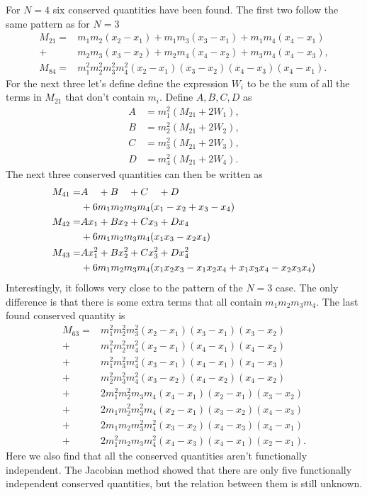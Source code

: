 \documentclass[english,master]{liumaiex}
\theoremstyle{plain}
\theoremstyle{definition}
\begin{document}
For $N = 4$ six conserved quantities have been found. The first two follow the same pattern as for $N = 3$
\begin{align}
	M_{21} = &m_1 m_2 (x_2 - x_1) + m_1 m_3 (x_3 - x_1) + m_1 m_4 (x_4 - x_1) \\ +  &m_2 m_3 (x_3 - x_2) + m_2 m_4 (x_4 - x_2) + m_3 m_4 (x_4 - x_3),\\
	M_{84} = &m_1^2m_2^2m_3^2m_4^2(x_2 - x_1)(x_3 - x_2)(x_4 - x_3)(x_4 - x_1).
\end{align}
For the next three let's define define the expression $W_i$ to be the sum of all the terms in $M_{21}$ that don't contain $m_i$. Define $A, B, C, D$ as
\begin{align}
	A &= m_1^2(M_{21} + 2W_1), \\
	B &= m_2^2(M_{21} + 2W_2), \\
	C &= m_3^2(M_{21} + 2W_3), \\
	D &= m_4^2(M_{21} + 2W_4).
\end{align}
The next  three conserved quantities can then be written as
\begin{align}
	M_{41} =& A\phantom{x_1} + B\phantom{x_2} + C\phantom{x_3} + D\phantom{x_4} \notag \\
	&+ 6m_1m_2m_3m_4 (x_1 - x_2 + x_3 - x_4) \\
	M_{42} =& Ax_1 + Bx_2 + Cx_3 + Dx_4 \notag \\
	&+ 6m_1m_2m_3m_4 (x_1x_3 - x_2x_4) \\
	M_{43} =& Ax_1^2 + Bx_2^2 + Cx_3^2 + Dx_4^2 \notag \\
	&+ 6m_1m_2m_3m_4 (x_1x_2x_3 - x_1x_2x_4 + x_1x_3x_4 - x_2x_3x_4)
\end{align}
%
Interestingly, it follows very close to the pattern of the $N = 3$ case. The only difference is that there is some extra terms that all contain $m_1m_2m_3m_4$. The last found conserved quantity is
\begin{equation}
\begin{aligned}
	M_{63} =
		 &m_1^2m_2^2m_3^2(x_2 - x_1)(x_3 - x_1)(x_3 - x_2) \\
		+&m_1^2m_2^2m_4^2(x_2 - x_1)(x_4 - x_1)(x_4 - x_2) \\
		+&m_1^2m_3^2m_4^2(x_3 - x_1)(x_4 - x_1)(x_4 - x_3) \\
		+&m_2^2m_3^2m_4^2(x_3 - x_2)(x_4 - x_2)(x_4 - x_2) \\
		+&2m_1^2m_2^2m_3m_4(x_4 - x_1)(x_2 - x_1)(x_3 - x_2) \\
		+&2m_1m_2^2m_3^2m_4(x_2 - x_1)(x_3 - x_2)(x_4 - x_3) \\
		+&2m_1m_2m_3^2m_4^2(x_3 - x_2)(x_4 - x_3)(x_4 - x_1) \\
		+&2m_1^2m_2m_3m_4^2(x_4 - x_3)(x_4 - x_1)(x_2 - x_1).
\end{aligned}
\end{equation}
Here we also find that all the conserved quantities aren't functionally independent. The Jacobian method showed that there are only five functionally independent conserved quantities, but the relation between them is still unknown.
\end{document}

